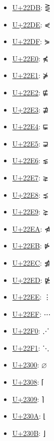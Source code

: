 \begin{itemize}
	\item \href{https://decodeunicode.org/en/u+22DB}{U+22DB}: ⋛
	\item \href{https://decodeunicode.org/en/u+22DE}{U+22DE}: ⋞
	\item \href{https://decodeunicode.org/en/u+22DF}{U+22DF}: ⋟
	\item \href{https://decodeunicode.org/en/u+22E0}{U+22E0}: ⋠
	\item \href{https://decodeunicode.org/en/u+22E1}{U+22E1}: ⋡
	\item \href{https://decodeunicode.org/en/u+22E2}{U+22E2}: ⋢
	\item \href{https://decodeunicode.org/en/u+22E3}{U+22E3}: ⋣
	\item \href{https://decodeunicode.org/en/u+22E4}{U+22E4}: ⋤
	\item \href{https://decodeunicode.org/en/u+22E5}{U+22E5}: ⋥
	\item \href{https://decodeunicode.org/en/u+22E6}{U+22E6}: ⋦
	\item \href{https://decodeunicode.org/en/u+22E7}{U+22E7}: ⋧
	\item \href{https://decodeunicode.org/en/u+22E8}{U+22E8}: ⋨
	\item \href{https://decodeunicode.org/en/u+22E9}{U+22E9}: ⋩
	\item \href{https://decodeunicode.org/en/u+22EA}{U+22EA}: ⋪
	\item \href{https://decodeunicode.org/en/u+22EB}{U+22EB}: ⋫
	\item \href{https://decodeunicode.org/en/u+22EC}{U+22EC}: ⋬
	\item \href{https://decodeunicode.org/en/u+22ED}{U+22ED}: ⋭
	\item \href{https://decodeunicode.org/en/u+22EE}{U+22EE}: ⋮
	\item \href{https://decodeunicode.org/en/u+22EF}{U+22EF}: ⋯
	\item \href{https://decodeunicode.org/en/u+22F0}{U+22F0}: ⋰
	\item \href{https://decodeunicode.org/en/u+22F1}{U+22F1}: ⋱
	\item \href{https://decodeunicode.org/en/u+2300}{U+2300}: ⌀
	\item \href{https://decodeunicode.org/en/u+2308}{U+2308}: ⌈
	\item \href{https://decodeunicode.org/en/u+2309}{U+2309}: ⌉
	\item \href{https://decodeunicode.org/en/u+230A}{U+230A}: ⌊
	\item \href{https://decodeunicode.org/en/u+230B}{U+230B}: ⌋

\end{itemize}
